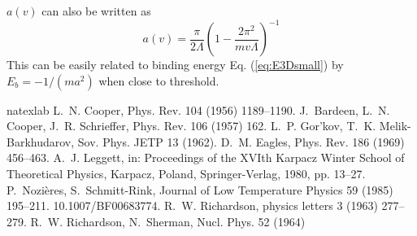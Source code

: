 \documentclass[3p,twocolumn]{elsarticle}
\begin{document}
$a(v)$ can also be written as
\begin{equation}
a(v)=\frac{\pi}{2\Lambda}\left(1-\frac{2\pi^{2}}{mv\Lambda}\right)^{-1}
\end{equation}
This can be easily related to binding energy Eq. (\ref{eq:E3Dsmall}) by $E_{b}=-1/(ma^{2})$ when close to threshold. 
%
%
%
%
%
\begin{thebibliography}{18}
\expandafter\ifx\csname natexlab\endcsname\relax\def\natexlab#1{#1}\fi
\providecommand{\bibinfo}[2]{#2}
\ifx\xfnm\relax \def\xfnm[#1]{\unskip,\space#1}\fi
\bibinfo{author}{L.~N. Cooper}, \bibinfo{journal}{Phys. Rev.}
  \bibinfo{volume}{104} (\bibinfo{year}{1956}) \bibinfo{pages}{1189--1190}.
\bibinfo{author}{J.~Bardeen}, \bibinfo{author}{L.~N. Cooper},
  \bibinfo{author}{J.~R. Schrieffer}, \bibinfo{journal}{Phys. Rev.}
  \bibinfo{volume}{106} (\bibinfo{year}{1957}) \bibinfo{pages}{162}.
\bibinfo{author}{L.~P. {Gor'kov}}, \bibinfo{author}{T.~K. Melik-Barkhudarov},
  \bibinfo{journal}{Sov. Phys. JETP} \bibinfo{volume}{13}
  (\bibinfo{year}{1962}).
\bibinfo{author}{D.~M. Eagles}, \bibinfo{journal}{Phys. Rev.}
  \bibinfo{volume}{186} (\bibinfo{year}{1969}) \bibinfo{pages}{456--463}.
\bibinfo{author}{A.~J. Leggett}, in: \bibinfo{booktitle}{Proceedings of the
  XVIth Karpacz Winter School of Theoretical Physics, Karpacz, Poland},
  \bibinfo{publisher}{Springer-Verlag}, \bibinfo{year}{1980}, pp.
  \bibinfo{pages}{13--27}.
\bibinfo{author}{P.~Nozi\`{e}res}, \bibinfo{author}{S.~Schmitt-Rink},
  \bibinfo{journal}{Journal of Low Temperature Physics} \bibinfo{volume}{59}
  (\bibinfo{year}{1985}) \bibinfo{pages}{195--211}.
  \bibinfo{note}{10.1007/BF00683774}.
\bibinfo{author}{R.~W. Richardson}, \bibinfo{journal}{physics letters}
  \bibinfo{volume}{3} (\bibinfo{year}{1963}) \bibinfo{pages}{277--279}.
\bibinfo{author}{R.~W. Richardson}, \bibinfo{author}{N.~Sherman},
  \bibinfo{journal}{Nucl. Phys.} \bibinfo{volume}{52} (\bibinfo{year}{1964})

\end{thebibliography}
\end{document}
